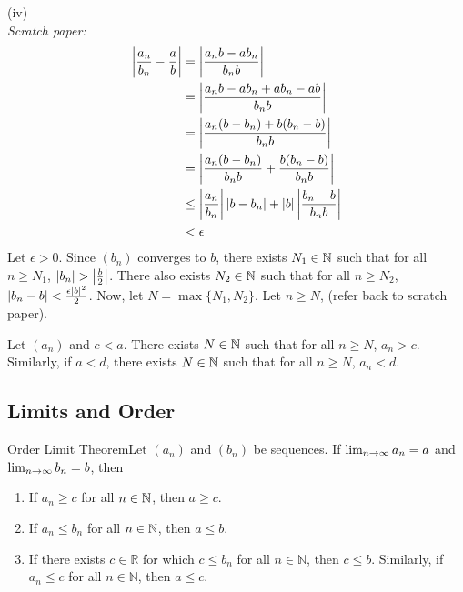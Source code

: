 {(iv) \\
\textit{Scratch paper:}
\begin{align*}
    \left|\frac{a_n}{b_n} - \frac{a}{b}\right| & = \left|\frac{a_nb - ab_n}{b_nb}\right|                                                     \\
                                           & = \left|\frac{a_nb - ab_n + ab_n - ab}{b_nb}\right|                                         \\
                                           & = \left|\frac{a_n(b - b_n) + b(b_n - b)}{b_nb}\right|                                       \\
                                           & = \left|\frac{a_n(b - b_n)}{b_nb} + \frac{b(b_n - b)}{b_nb}\right|                          \\
                                           & \leq \left|\frac{a_n}{b_n}\right|\left|b - b_n\right| + \left|b\right|\left|\frac{b_n - b}{b_nb}\right| \\
                                           & < \epsilon
\end{align*}
Let \(\epsilon > 0\). Since \((b_n)\) converges to \(b\), there exists \(N_1 \in \mathbb{N}\) such that for all \(n \geq N_1\), \(\left|b_n \right| > \left|\frac{b}{2}\right|\). There also exists \(N_2 \in \mathbb{N}\) such that for all \(n \geq N_2\), \(\left|b_n - b\right| < \frac{\epsilon|b|^{2}}{2}\). Now, let \(N = \max\{N_1, N_2\}\). Let \(n \geq N\), (refer back to scratch paper). \qedhere
}

\begin{lemma}
    Let \((a_n)\) and \(c < a\). There exists \(N \in \mathbb{N}\) such that for all \(n \geq N\), \(a_n > c\). Similarly, if \(a < d\), there exists \(N \in \mathbb{N}\) such that for all \(n \geq N\), \(a_n < d\).
\end{lemma}

\subsection{Limits and Order}

\begin{ntheorem}
    {Order Limit Theorem}Let \((a_n)\) and \((b_n)\) be sequences. If \(\lim_{n \rightarrow \infty}a_n = a\) and \(\lim_{n \rightarrow \infty}b_n = b\), then
    \begin{enumerate}[label=(\roman*)]
        \item If \(a_n \geq c\) for all \(n \in \mathbb{N}\), then \(a \geq c\).
        \item If \(a_n \leq b_n\) for all \(n \in \mathbb{N}\), then \(a \leq b\).
        \item If there exists \( c \in \mathbb{R} \) for which \( c \leq b_n \) for all \( n \in \mathbb{N} \), then \( c \leq b \). Similarly, if \( a_n \leq c \) for all \( n \in \mathbb{N} \), then \( a \leq c \).
        
    \end{enumerate}
\end{ntheorem}



